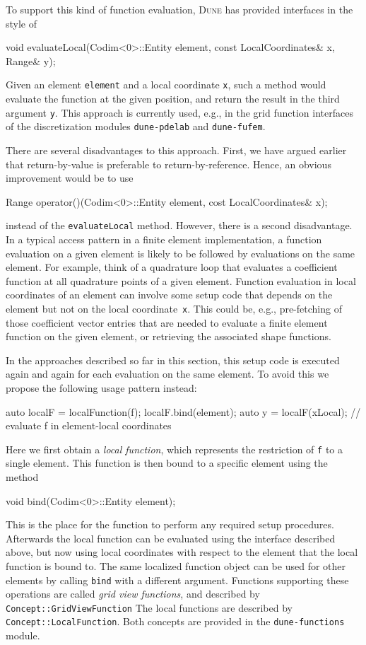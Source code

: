 \documentclass[11pt,
                 numbers=noenddot,
                 headings=normal,
                 DIV16, BCOR10mm]{scrartcl}
\newcommand{\cpp}{\lstinline}
\theoremstyle{remark}
\newcommand{\dune}{\textsc{Dune}\xspace}
\newcommand{\dunemodule}[1]{\texttt{#1}}
\begin{document}
To support this kind of function evaluation, \dune has provided interfaces in the style of
\begin{c++}
void evaluateLocal(Codim<0>::Entity element,
                   const LocalCoordinates& x,
                   Range& y);
\end{c++}
Given an element \cpp{element} and a local coordinate \cpp{x}, such a method would evaluate the function at
the given position, and return the result in the third argument \cpp{y}.
This approach is currently used, e.g., in the
grid function interfaces of the discretization modules \dunemodule{dune-pdelab} and \dunemodule{dune-fufem}.

There are several disadvantages to this approach. First, we have argued earlier that return-by-value is preferable to
return-by-reference.  Hence, an obvious improvement would be to use
\begin{c++}
Range operator()(Codim<0>::Entity element, cost LocalCoordinates& x);
\end{c++}
instead of the \cpp{evaluateLocal} method.
However, there is a second disadvantage.  In a typical access pattern in a finite element implementation,
a function evaluation on a given element is likely to be followed by evaluations on the same element.
For example, think of a quadrature loop that evaluates a coefficient function at all quadrature points
of a given element.  Function evaluation in local coordinates of an element can involve some setup code
that depends on the element but not on the local coordinate~\cpp{x}. This could be, e.g., pre-fetching of those
coefficient vector entries that are needed to evaluate a finite element function on the given element,
or retrieving the associated shape functions.

In the approaches described so far in this section, this setup code is executed again and again for each evaluation
on the same element. To avoid this we propose the following usage pattern instead:
\begin{c++}
auto localF = localFunction(f);
localF.bind(element);
auto y = localF(xLocal);           // evaluate f in element-local coordinates
\end{c++}
Here we first obtain a \emph{local function}, which represents the restriction of \cpp{f} to a single
element. This function is then bound to a specific element using the method
\begin{c++}
void bind(Codim<0>::Entity element);
\end{c++}
This is the place for the function to perform any required setup procedures.
Afterwards the local function can be evaluated using the interface described above,
but now using local coordinates with respect to the element that the local function is bound to. The same
localized function object can be used for other elements by calling \cpp{bind} with a different argument.
Functions supporting these operations are called {\em grid view functions}, and described by \cpp{Concept::GridViewFunction}
The local functions are described by \cpp{Concept::LocalFunction}.
Both concepts are provided in the \dunemodule{dune-functions} module.
\end{document}
